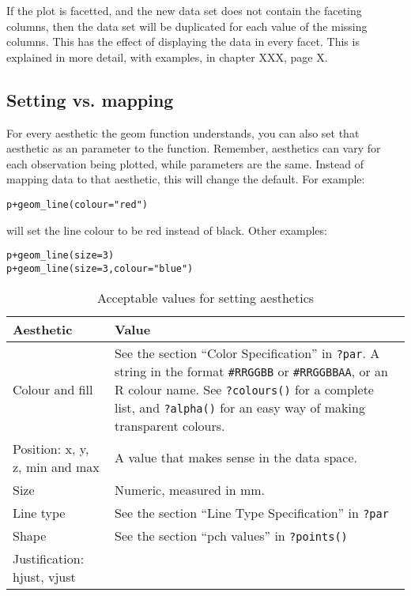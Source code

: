 If the plot is facetted, and the new data set does not contain the faceting columns, then the data set will be duplicated for each value of the missing columns.  This has the effect of displaying the data in every facet.  This is explained in more detail, with examples, in chapter XXX, page X.

\subsection{Setting vs. mapping}
\label{sub:setting-mapping}

For every aesthetic the geom function understands, you can also set that aesthetic as an parameter to the function.  Remember, aesthetics can vary for each observation being plotted, while parameters are the same.  Instead of mapping data to that aesthetic, this will change the default.  For example:

\begin{alltt}
p + geom_line(colour="red")  
\end{alltt}

\noindent will set the line colour to be red instead of black.  Other examples:

\begin{alltt}
p + geom_line(size=3)  
p + geom_line(size=3, colour="blue")  
\end{alltt}

\begin{table}
  \begin{center}
  \begin{tabular}{lp{3in}}
    \toprule
    Aesthetic & Value \\
    \midrule
    Colour and fill & See the section ``Color Specification'' in {\tt ?par}.  A string in the format {\tt \#RRGGBB} or {\tt \#RRGGBBAA}, or an R colour name.  See {\tt ?colours()} for a complete list, and {\tt ?alpha()} for an easy way of making transparent colours. \\
    Position: x, y, z, min and max & A value that makes sense in the data space. \\ 
    Size & Numeric, measured in mm.\\
    Line type &  See the section ``Line Type Specification'' in {\tt ?par}\\
    Shape & See the section ``pch values'' in {\tt ?points()} \\
    Justification: hjust, vjust &  \\
    \bottomrule
  \end{tabular}
  \end{center}
  \caption{Acceptable values for setting aesthetics}
  \label{tbl:aesthetic-values}
\end{table}

